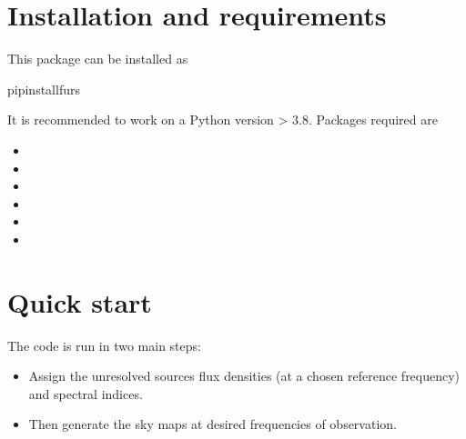 \documentclass[letterpaper,10pt,english]{sphinxmanual}
\begin{document}
\section{Installation and requirements}
\label{\detokenize{basics:installation-and-requirements}}
\sphinxAtStartPar
This package can be installed as

\begin{sphinxVerbatim}[commandchars=\\\{\}]
pipinstallfurs
\end{sphinxVerbatim}

\sphinxAtStartPar
It is recommended to work on a Python version \textgreater{} 3.8. Packages required are
\begin{itemize}
\item {} 
\sphinxAtStartPar
{}

\item {} 
\sphinxAtStartPar
{}

\item {} 
\sphinxAtStartPar
{}

\item {} 
\sphinxAtStartPar
{}

\item {} 
\sphinxAtStartPar
{}

\item {} 
\sphinxAtStartPar
{}

\end{itemize}


\section{Quick start}
\label{\detokenize{basics:quick-start}}
\sphinxAtStartPar
The code is run in two main steps:
\begin{itemize}
\item {} 
\sphinxAtStartPar
Assign the unresolved sources flux densities (at a chosen reference frequency) and spectral indices.

\item {} 
\sphinxAtStartPar
Then generate the sky maps at desired frequencies of observation.

\end{itemize}
\end{document}
